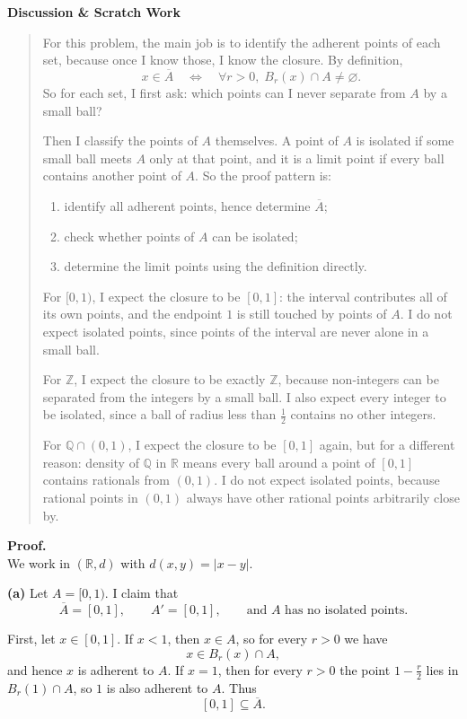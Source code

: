 \documentclass[12pt]{article}
\newenvironment{scratch}{%
  \par\smallskip
  \noindent\textbf{Discussion \& Scratch Work}\begin{quote}\small
}{%
  \end{quote}\smallskip
}
\begin{document}
\begin{scratch}
For this problem, the main job is to identify the adherent points of each set, because once I know those, I know the closure. By definition,
\[
x\in\overline{A}
\quad\Longleftrightarrow\quad
\forall r>0,\; B_r(x)\cap A\neq\varnothing.
\]
So for each set, I first ask: which points can I never separate from $A$ by a small ball?

Then I classify the points of $A$ themselves. A point of $A$ is isolated if some small ball meets $A$ only at that point, and it is a limit point if every ball contains another point of $A$. So the proof pattern is:
\begin{enumerate}[label=\textbf{(\arabic*)}]
    \item identify all adherent points, hence determine $\overline{A}$;
    \item check whether points of $A$ can be isolated;
    \item determine the limit points using the definition directly.
\end{enumerate}

For $[0,1)$, I expect the closure to be $[0,1]$: the interval contributes all of its own points, and the endpoint $1$ is still touched by points of $A$. I do not expect isolated points, since points of the interval are never alone in a small ball.

For $\mathbb{Z}$, I expect the closure to be exactly $\mathbb{Z}$, because non-integers can be separated from the integers by a small ball. I also expect every integer to be isolated, since a ball of radius less than $\tfrac12$ contains no other integers.

For $\mathbb{Q}\cap(0,1)$, I expect the closure to be $[0,1]$ again, but for a different reason: density of $\mathbb{Q}$ in $\mathbb{R}$ means every ball around a point of $[0,1]$ contains rationals from $(0,1)$. I do not expect isolated points, because rational points in $(0,1)$ always have other rational points arbitrarily close by.
\end{scratch}

\textbf{Proof.}\\
We work in $(\mathbb{R},d)$ with $d(x,y)=|x-y|$.

\textbf{(a) }Let $A=[0,1)$. I claim that
\[
\overline{A}=[0,1],
\qquad
A'=[0,1],
\qquad
\text{and }A\text{ has no isolated points}.
\]

First, let $x\in[0,1]$. If $x<1$, then $x\in A$, so for every $r>0$ we have
\[
x\in B_r(x)\cap A,
\]
and hence $x$ is adherent to $A$. If $x=1$, then for every $r>0$ the point $1-\frac r2$ lies in $B_r(1)\cap A$, so $1$ is also adherent to $A$. Thus
\[
[0,1]\subseteq \overline{A}.
\]
\end{document}
